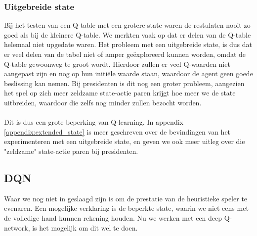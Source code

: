 \documentclass[11pt]{article}
\begin{document}
\subsubsection{Uitgebreide state}
Bij het testen van een Q-table met een grotere state waren de restulaten nooit zo goed als bij de kleinere Q-table. We merkten vaak op dat er delen van de Q-table helemaal niet upgedate waren. Het probleem met een uitgebreide state, is dus dat er veel delen van de tabel niet of amper geëxploreerd kunnen worden, omdat de Q-table gewoonweg te groot wordt. Hierdoor zullen er veel Q-waarden niet aangepast zijn en nog op hun initiële waarde staan, waardoor de agent geen goede beslissing kan nemen. Bij presidenten is dit nog een groter probleem, aangezien het spel op zich meer zeldzame state-actie paren krijgt hoe meer we de state uitbreiden, waardoor die zelfs nog minder zullen bezocht worden.\\\\ 
Dit is dus een grote beperking van Q-learning. In appendix \ref{appendix:extended_state} is meer geschreven over de bevindingen van het experimenteren met een uitgebreide state, en geven we ook meer uitleg over die "zeldzame" state-actie paren bij presidenten.

\subsection{DQN}
Waar we nog niet in geslaagd zijn is om de prestatie van de heuristieke speler te evenaren. Een mogelijke verklaring is de beperkte state, waarin we niet eens met de volledige hand kunnen rekening houden. Nu we werken met een deep Q-network, is het mogelijk om dit wel te doen.
\end{document}
